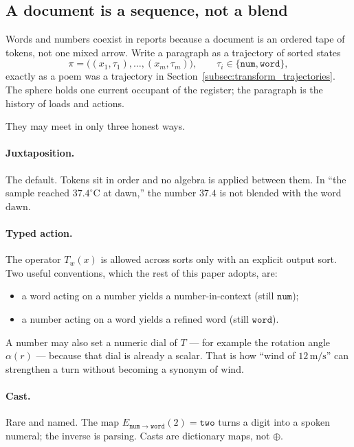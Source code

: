 \documentclass[12pt, a4paper]{article}
\begin{document}
\subsection{A document is a sequence, not a blend}
\label{subsec:document_sequence}
Words and numbers coexist in reports because a document is an ordered
tape of tokens, not one mixed arrow. Write a paragraph as a trajectory
of sorted states
\begin{equation}
    \pi = \bigl((x_1,\tau_1),\ldots,(x_m,\tau_m)\bigr),
    \qquad \tau_i\in\{\mathtt{num},\mathtt{word}\},
    \label{eq:mixed_document}
\end{equation}
exactly as a poem was a trajectory in
Section~\ref{subsec:transform_trajectories}. The sphere holds one
current occupant of the register; the paragraph is the history of
loads and actions.

They may meet in only three honest ways.

\paragraph{Juxtaposition.}
The default. Tokens sit in order and no algebra is applied between
them. In ``the sample reached $37.4^\circ\mathrm{C}$ at dawn,'' the
number $37.4$ is not blended with the word $\mathrm{dawn}$.

\paragraph{Typed action.}
The operator $T_w(x)$ is allowed across sorts only with an explicit
output sort. Two useful conventions, which the rest of this paper
adopts, are:
\begin{itemize}
    \item a word acting on a number yields a number-in-context
          (still $\mathtt{num}$);
    \item a number acting on a word yields a refined word
          (still $\mathtt{word}$).
\end{itemize}
A number may also set a numeric dial of $T$ --- for example the
rotation angle $\alpha(r)$ --- because that dial is already a scalar.
That is how ``wind of $12\,\mathrm{m/s}$'' can strengthen a turn
without becoming a synonym of $\mathrm{wind}$.

\paragraph{Cast.}
Rare and named. The map $E_{\mathtt{num}\to\mathtt{word}}(2)=\texttt{two}$
turns a digit into a spoken numeral; the inverse is parsing. Casts are
dictionary maps, not $\oplus$.
\end{document}
